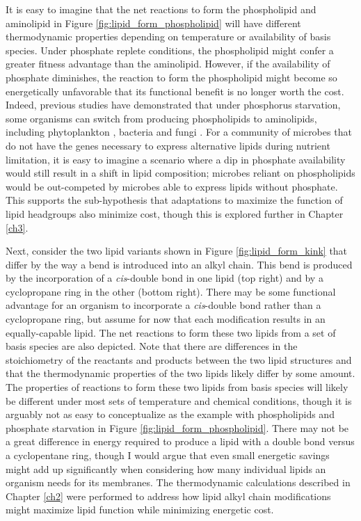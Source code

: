 It is easy to imagine that the net reactions to form the phospholipid and aminolipid in Figure \ref{fig:lipid_form_phospholipid} will have different thermodynamic properties depending on temperature or availability of basis species. Under phosphate replete conditions, the phospholipid might confer a greater fitness advantage than the aminolipid. However, if the availability of phosphate diminishes, the reaction to form the phospholipid might become so energetically unfavorable that its functional benefit is no longer worth the cost. Indeed, previous studies have demonstrated that under phosphorus starvation, some organisms can switch from producing phospholipids to aminolipids, including phytoplankton \citep{van2009phytoplankton, martin2011phosphorus}, bacteria \citep{minnikin1974replacement, benning1995accumulation} and fungi \citep{riekhof2014phosphate}. For a community of microbes that do not have the genes necessary to express alternative lipids during nutrient limitation, it is easy to imagine a scenario where a dip in phosphate availability would still result in a shift in lipid composition; microbes reliant on phospholipids would be out-competed by microbes able to express lipids without phosphate. This supports the sub-hypothesis that adaptations to maximize the function of lipid headgroups also minimize cost, though this is explored further in Chapter \ref{ch3}.

Next, consider the two lipid variants shown in Figure \ref{fig:lipid_form_kink} that differ by the way a bend is introduced into an alkyl chain. This bend is produced by the incorporation of a \textit{cis}-double bond in one lipid (top right) and by a cyclopropane ring in the other (bottom right). There may be some functional advantage for an organism to incorporate a \textit{cis}-double bond rather than a cyclopropane ring, but assume for now that each modification results in an equally-capable lipid. The net reactions to form these two lipids from a set of basis species are also depicted. Note that there are differences in the stoichiometry of the reactants and products between the two lipid structures and that the thermodynamic properties of the two lipids likely differ by some amount. The properties of reactions to form these two lipids from basis species will likely be different under most sets of temperature and chemical conditions, though it is arguably not as easy to conceptualize as the example with phospholipids and phosphate starvation in Figure \ref{fig:lipid_form_phospholipid}. There may not be a great difference in energy required to produce a lipid with a double bond versus a cyclopentane ring, though I would argue that even small energetic savings might add up significantly when considering how many individual lipids an organism needs for its membranes. The thermodynamic calculations described in Chapter \ref{ch2} were performed to address how lipid alkyl chain modifications might maximize lipid function while minimizing energetic cost.

